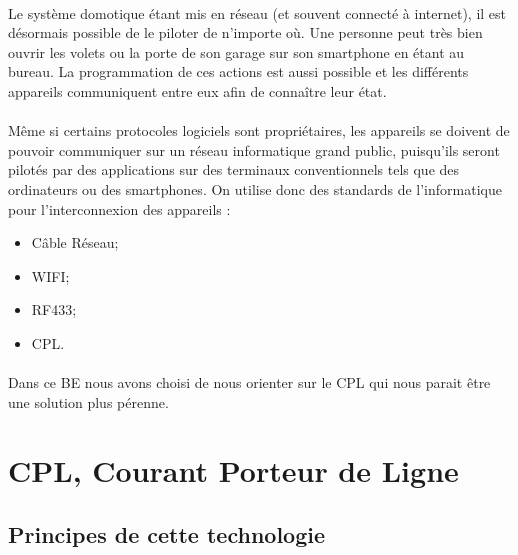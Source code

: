         \paragraph{}
Le système domotique étant mis en réseau (et souvent connecté à internet), il est désormais possible de le piloter de n’importe où.
Une personne peut très bien ouvrir les volets ou la porte de son garage sur son smartphone en étant au bureau.
La programmation de ces actions est aussi possible et les différents appareils communiquent entre eux afin de connaître leur état.
        \paragraph{}
Même si certains protocoles logiciels sont propriétaires, les appareils se doivent de pouvoir communiquer sur un réseau informatique grand public,
puisqu’ils seront pilotés par des applications sur des terminaux conventionnels tels que des ordinateurs ou des smartphones.
On utilise donc des standards de l’informatique pour l’interconnexion des appareils :
            \begin{itemize}
                \item Câble Réseau;
                \item WIFI;
                \item RF433;
                \item CPL.
            \end{itemize}
        \paragraph{}
Dans ce BE nous avons choisi de nous orienter sur le CPL qui nous parait être une solution plus pérenne.


    \section{CPL, Courant Porteur de Ligne}
        \subsection{Principes de cette technologie}
